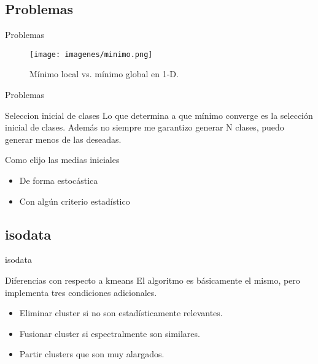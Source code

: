 \documentclass[handout]{beamer}
\begin{document}
\subsection{Problemas}

\begin{frame}{Problemas}
  \begin{figure}
    \texttt{[image: imagenes/minimo.png]}
    \caption{M\'inimo local vs. m\'inimo global en 1-D.}
  \end{figure}
\end{frame}

\begin{frame}{Problemas}
  \begin{alertblock}{Seleccion inicial de clases}
    Lo que determina a que m\'inimo converge es la selecci\'on inicial de clases. Adem\'as no siempre me garantizo generar N clases, puedo generar menos de las deseadas.
  \end{alertblock}\pause
  \begin{block}{Como elijo las medias iniciales}
    \begin{itemize}[<+>]
      \item De forma estoc\'astica
      \item Con alg\'un criterio estad\'istico
    \end{itemize}
  \end{block}
\end{frame}

\subsection{isodata}

\begin{frame}{isodata}
  \begin{block}{Diferencias con respecto a kmeans}
    El algoritmo es b\'asicamente el mismo, pero implementa tres condiciones adicionales.
    \begin{itemize}[<+>]
      \item Eliminar cluster si no son estad\'isticamente relevantes.
      \item Fusionar cluster si espectralmente son similares.
      \item Partir clusters que son muy alargados.
    \end{itemize}
  \end{block}
\end{frame}
\end{document}
